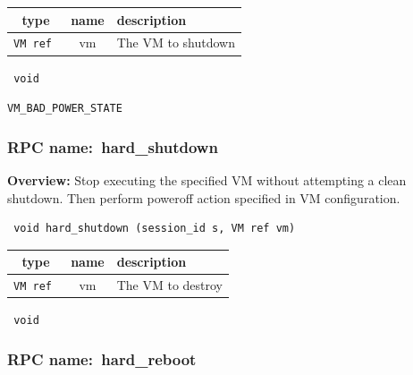 
 
\vspace{0.3cm}
\begin{tabular}{|c|c|p{7cm}|}
 \hline
{\bf type} & {\bf name} & {\bf description} \\ \hline
{\tt VM ref } & vm & The VM to shutdown \\ \hline 

\end{tabular}

\vspace{0.3cm}

{\tt 
void
}



\vspace{0.3cm}

 {\tt VM\_BAD\_POWER\_STATE}

\vspace{0.6cm}
\subsubsection{RPC name:~hard\_shutdown}

{\bf Overview:} 
Stop executing the specified VM without attempting a clean shutdown. Then
perform poweroff action specified in VM configuration.

\begin{verbatim} void hard_shutdown (session_id s, VM ref vm)\end{verbatim}



 
\vspace{0.3cm}
\begin{tabular}{|c|c|p{7cm}|}
 \hline
{\bf type} & {\bf name} & {\bf description} \\ \hline
{\tt VM ref } & vm & The VM to destroy \\ \hline 

\end{tabular}

\vspace{0.3cm}

{\tt 
void
}



\vspace{0.3cm}
\vspace{0.3cm}
\vspace{0.3cm}
\subsubsection{RPC name:~hard\_reboot}

